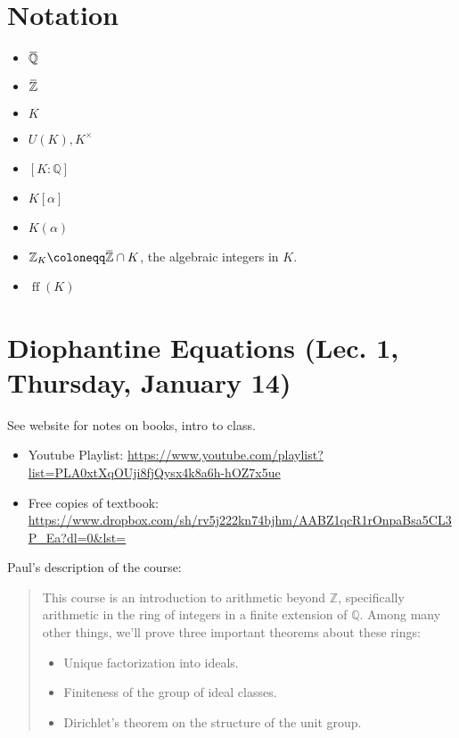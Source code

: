 \newpage

\tableofcontents
\newpage

\hypertarget{notation}{%
\section{Notation}\label{notation}}


\begin{itemize}
\tightlist
\item
  \(\mkern 1.5mu\overline{\mkern-1.5mu{\mathbb{Q}}\mkern-1.5mu}\mkern 1.5mu\)
\item
  \(\mkern 1.5mu\overline{\mkern-1.5mu{\mathbb{Z}}\mkern-1.5mu}\mkern 1.5mu\)
\item
  \(K\)
\item
  \(U(K), K^{\times}\)
\item
  \([K: {\mathbb{Q}}]\)
\item
  \(K[\alpha]\)
\item
  \(K(\alpha)\)
\item
  \({\mathbb{Z}}_K \coloneqq\mkern 1.5mu\overline{\mkern-1.5mu{\mathbb{Z}}\mkern-1.5mu}\mkern 1.5mu \cap K\),
  the algebraic integers in \(K\).
\item
  \(\operatorname{ff}(K)\)
\end{itemize}

\hypertarget{diophantine-equations-lec.-1-thursday-january-14}{%
\section{Diophantine Equations (Lec. 1, Thursday, January
14)}\label{diophantine-equations-lec.-1-thursday-january-14}}

See website for notes on books, intro to class.

\begin{itemize}
\item
  Youtube Playlist:
  \url{https://www.youtube.com/playlist?list=PLA0xtXqOUji8fjQysx4k8a6h-hOZ7x5ue}
\item
  Free copies of textbook:
  \url{https://www.dropbox.com/sh/rv5j222kn74bjhm/AABZ1qcR1rOnpaBsa5CL3P_Ea?dl=0\&lst=}
\end{itemize}

Paul's description of the course:

\begin{quote}
This course is an introduction to arithmetic beyond \({\mathbb{Z}}\),
specifically arithmetic in the ring of integers in a finite extension of
\({\mathbb{Q}}\). Among many other things, we'll prove three important
theorems about these rings:

\begin{itemize}
\tightlist
\item
  Unique factorization into ideals.
\item
  Finiteness of the group of ideal classes.
\item
  Dirichlet's theorem on the structure of the unit group.
\end{itemize}
\end{quote}


